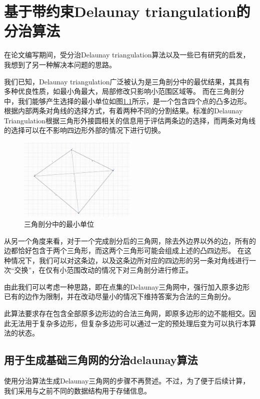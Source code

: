 \chapter{基于带约束Delaunay triangulation的分治算法}

在论文编写期间，受分治Delaunay triangulation算法以及一些已有研究的启发，我想到了另一种解决本问题的思路。

我们已知，Delaunay triangulation广泛被认为是三角剖分中的最优结果，其具有多种优良性质，如最小角最大，局部修改只影响小范围区域等。
而在三角剖分中，我们能够产生选择的最小单位如图\ref*{basecell}所示，是一个包含四个点的凸多边形。根据内部两条对角线的选择方式，有着两种不同的分割结果。标准的Delaunay Triangulation根据三角形外接圆相关的信息用于评估两条边的选择，而两条对角线的选择可以在不影响四边形外部的情况下进行切换。

\begin{figure}[htp]
    \centering
    \includegraphics[width=0.5\textwidth]
    {figures/basecell.png}
    \caption{三角剖分中的最小单位}
    \label{basecell}
  \end{figure}

从另一个角度来看，对于一个完成剖分后的三角网，除去外边界以外的边，所有的边都恰好包含于两个三角形，而这两个三角形可能会组成上述的凸四边形。
在这种情况下，我们可以对这条边，以及这条边所对应的四边形的另一条对角线进行一次“交换”，在仅有小范围改动的情况下对三角剖分进行修正。

由此我们可以考虑一种思路，即在点集的Delaunay三角网中，强行加入原多边形已有的边作为限制，并在改动尽量小的情况下维持答案为合法的三角剖分。

此算法要求存在包含全部原多边形边的合法三角网，即原多边形的边不能相交。因此无法用于复杂多边形，但复杂多边形可以通过一定的预处理后变为可以执行本算法的状态。

\section{用于生成基础三角网的分治delaunay算法}
使用分治算法生成Delaunay三角网的步骤不再赘述。不过，为了便于后续计算，我们采用与之前不同的数据结构用于存储信息。

